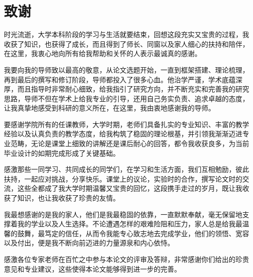 \section*{致谢}

时光流逝，大学本科阶段的学习与生活就要结束，回想这段充实又宝贵的过程，我收获了知识，也获得了成长，而且得到了师长、同窗以及家人细心的扶持和陪伴，在这里，我衷心地向所有给我帮助和关怀的人表示最诚真的感谢。

我要向我的导师致以最高的敬意，从论文选题开始，一直到框架搭建、理论梳理，再到最后的撰写和修订阶段，导师都投入了很多心血。他治学严谨，学术底蕴深厚，而且指导时非常耐心细致，给我指引了研究方向，并不断充实和完善我的研究思路，导师不但在学术上给我专业的引导，还用自己务实负责、追求卓越的态度，让我真挚地感受到科研的意义所在，在这里，我由衷地感谢我的导师。

要感谢学院所有的任课教师，大学时期，老师们具备扎实的专业知识、丰富的教学经验以及认真负责的教学态度，给我构筑了稳固的理论根基，并引领我渐渐迈进专业范畴，无论是课堂上细致的讲解还是课后耐心的回答，都令我收获良多，为当前毕业设计的如期完成形成了关键基础。

感激那些一同学习、共同成长的同学们，在学习和生活方面，我们互相勉励，彼此扶持，一起应对挑战，分享快乐。课堂上的议论，实验时的合作，撰写论文时的交流，这些全都成了我大学时期温馨又宝贵的回忆，这段携手走过的岁月，既让我收获了知识，也让我收获了珍贵的友情。

我最想感谢的是我的家人，他们是我最稳固的依靠，一直默默奉献，毫无保留地支撑着我的学业以及人生选择。不论遭遇怎样的艰难险阻和压力，家人总是给我最温馨的鼓舞，最笃定的信任，从而令我能专心致志地去完成学业，他们的领悟、宽容以及付出，便是我不断向前迈进的力量源泉和内心依恃。

感激各位专家老师在百忙之中参与本论文的评审及答辩，非常感谢你们给出的珍贵意见和专业建议，这些使得本论文能够得到进一步的完善。